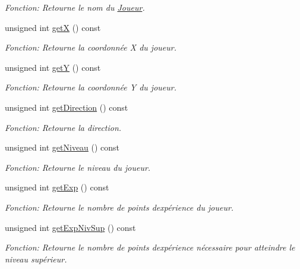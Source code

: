 \begin{DoxyCompactItemize}
\begin{DoxyCompactList}\small\item\em Fonction\+: Retourne le nom du \mbox{\hyperlink{classJoueur}{Joueur}}. \end{DoxyCompactList}\item 
unsigned int \mbox{\hyperlink{classJoueur_a0d86f3ee629b3061192a4ac6631bc608}{getX}} () const
\begin{DoxyCompactList}\small\item\em Fonction\+: Retourne la coordonnée X du joueur. \end{DoxyCompactList}\item 
unsigned int \mbox{\hyperlink{classJoueur_aa9c3a397e0ca29e7137effdbd693334d}{getY}} () const
\begin{DoxyCompactList}\small\item\em Fonction\+: Retourne la coordonnée Y du joueur. \end{DoxyCompactList}\item 
unsigned int \mbox{\hyperlink{classJoueur_a26b77ddad57c8aafd43d3bd0e192a75f}{get\+Direction}} () const
\begin{DoxyCompactList}\small\item\em Fonction\+: Retourne la direction. \end{DoxyCompactList}\item 
unsigned int \mbox{\hyperlink{classJoueur_abec464c3958916f951e19ba5e12d0dbc}{get\+Niveau}} () const
\begin{DoxyCompactList}\small\item\em Fonction\+: Retourne le niveau du joueur. \end{DoxyCompactList}\item 
unsigned int \mbox{\hyperlink{classJoueur_aca3db9562eeb1ca44522109610b9cd80}{get\+Exp}} () const
\begin{DoxyCompactList}\small\item\em Fonction\+: Retourne le nombre de points d\textquotesingle{}expérience du joueur. \end{DoxyCompactList}\item 
unsigned int \mbox{\hyperlink{classJoueur_a6a373cadbec2c4aa63efd813caea81c5}{get\+Exp\+Niv\+Sup}} () const
\begin{DoxyCompactList}\small\item\em Fonction\+: Retourne le nombre de points d\textquotesingle{}expérience nécessaire pour atteindre le niveau supérieur. \end{DoxyCompactList}\item 

\end{DoxyCompactItemize}
